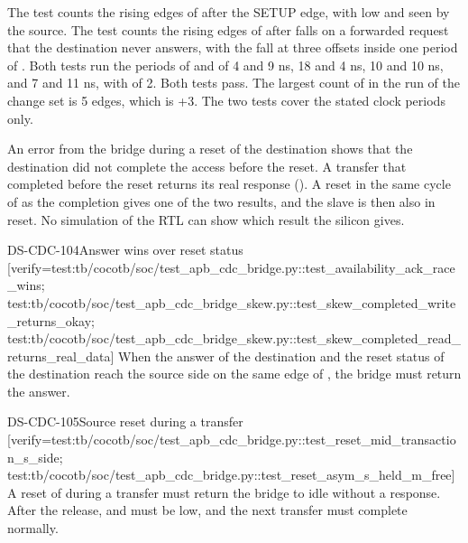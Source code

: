 \begin{information}
The test  counts the rising edges of  after the SETUP edge, with  low and seen by the source. The test  counts the rising edges of  after  falls on a forwarded request that the destination never answers, with the fall at three offsets inside one period of . Both tests run the periods of  and  of 4 and 9 ns, 18 and 4 ns, 10 and 10 ns, and 7 and 11 ns, with  of 2. Both tests pass. The largest count of  in the run of the change set is 5 edges, which is +3. The two tests cover the stated clock periods only.

An error from the bridge during a reset of the destination shows that the destination did not complete the access before the reset. A transfer that completed before the reset returns its real response (). A reset in the same cycle of  as the completion gives one of the two results, and the slave is then also in reset. No simulation of the RTL can show which result the silicon gives.
\end{information}

\begin{requirement}{DS-CDC-104}{Answer wins over reset status}
[verify={test:tb/cocotb/soc/test_apb_cdc_bridge.py::test_availability_ack_race_wins; test:tb/cocotb/soc/test_apb_cdc_bridge_skew.py::test_skew_completed_write_returns_okay; test:tb/cocotb/soc/test_apb_cdc_bridge_skew.py::test_skew_completed_read_returns_real_data}]
When the answer of the destination and the reset status of the destination reach the source side on the same edge of , the bridge must return the answer.
\end{requirement}

\begin{requirement}{DS-CDC-105}{Source reset during a transfer}
[verify={test:tb/cocotb/soc/test_apb_cdc_bridge.py::test_reset_mid_transaction_s_side; test:tb/cocotb/soc/test_apb_cdc_bridge.py::test_reset_asym_s_held_m_free}]
A reset of  during a transfer must return the bridge to idle without a response. After the release,  and  must be low, and the next transfer must complete normally.
\end{requirement}

